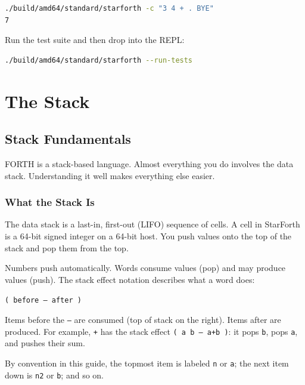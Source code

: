 \begin{lstlisting}[language=bash]
./build/amd64/standard/starforth -c "3 4 + . BYE"
7
\end{lstlisting}

Run the test suite and then drop into the REPL:

\begin{lstlisting}[language=bash]
./build/amd64/standard/starforth --run-tests
\end{lstlisting}

\part{The Stack}

\chapter{Stack Fundamentals}
\label{chap:stack-fundamentals}

FORTH is a stack-based language. Almost everything you do involves the data
stack. Understanding it well makes everything else easier.

\section{What the Stack Is}
\label{sec:what-the-stack-is}

The data stack is a last-in, first-out (LIFO) sequence of cells. A cell in
StarForth is a 64-bit signed integer on a 64-bit host. You push values onto
the top of the stack and pop them from the top.

Numbers push automatically. Words consume values (pop) and may produce values
(push). The stack effect notation describes what a word does:

\begin{center}
\texttt{( before -- after )}
\end{center}

Items before the \texttt{--} are consumed (top of stack on the right). Items
after are produced. For example, \texttt{+} has the stack effect
\texttt{( a b -- a+b )}: it pops \texttt{b}, pops \texttt{a}, and pushes
their sum.

By convention in this guide, the topmost item is labeled \texttt{n} or
\texttt{a}; the next item down is \texttt{n2} or \texttt{b}; and so on.

